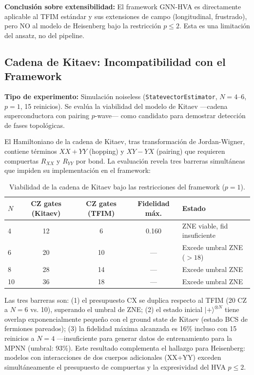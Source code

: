 \documentclass[11pt,a4paper,spanish]{book}
\begin{document}
\textbf{Conclusión sobre extensibilidad:} El framework GNN-HVA es directamente aplicable al TFIM estándar y sus extensiones de campo (longitudinal, frustrado), pero NO al modelo de Heisenberg bajo la restricción $p \leq 2$. Esta es una limitación del ansatz, no del pipeline.

\subsection{Cadena de Kitaev: Incompatibilidad con el Framework}

\textbf{Tipo de experimento:} Simulación noiseless (\texttt{StatevectorEstimator}, $N = 4$--$6$, $p = 1$, 15 reinicios). Se evalúa la viabilidad del modelo de Kitaev ---cadena superconductora con pairing $p$-wave--- como candidato para demostrar detección de fases topológicas.

El Hamiltoniano de la cadena de Kitaev, tras transformación de Jordan-Wigner, contiene términos $XX + YY$ (hopping) y $XY - YX$ (pairing) que requieren compuertas $R_{XX}$ y $R_{YY}$ por bond. La evaluación revela tres barreras simultáneas que impiden su implementación en el framework:

\begin{table}[h]
\centering
\caption{Viabilidad de la cadena de Kitaev bajo las restricciones del framework ($p = 1$).}
\label{tab:kitaev}
\begin{tabular}{lcccl}
\toprule
\textbf{$N$} & \textbf{CZ gates (Kitaev)} & \textbf{CZ gates (TFIM)} & \textbf{Fidelidad máx.} & \textbf{Estado} \\
\midrule
4 & 12 & 6 & 0.160 & ZNE viable, fid insuficiente \\
6 & 20 & 10 & — & Excede umbral ZNE ($>18$) \\
8 & 28 & 14 & — & Excede umbral ZNE \\
10 & 36 & 18 & — & Excede umbral ZNE \\
\bottomrule
\end{tabular}
\end{table}

Las tres barreras son: (1) el presupuesto CX se duplica respecto al TFIM (20 CZ a $N=6$ vs. 10), superando el umbral de ZNE; (2) el estado inicial $|+\rangle^{\otimes N}$ tiene overlap exponencialmente pequeño con el ground state de Kitaev (estado BCS de fermiones pareados); (3) la fidelidad máxima alcanzada es 16\% incluso con 15 reinicios a $N = 4$ ---insuficiente para generar datos de entrenamiento para la MPNN (umbral: 93\%). Este resultado complementa el hallazgo para Heisenberg: modelos con interacciones de dos cuerpos adicionales (XX+YY) exceden simultáneamente el presupuesto de compuertas y la expresividad del HVA $p \leq 2$.
\end{document}
